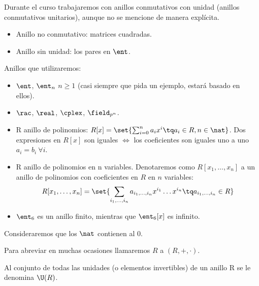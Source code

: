 \nota Durante el curso trabajaremos con anillos conmutativos con unidad (anillos conmutativos unitarios), aunque no se mencione de manera explícita.

\begin{example}
\begin{itemize}
	\item Anillo no conmutativo: matrices cuadradas.
	\item Anillo sin unidad: los pares en $\ent$.
\end{itemize}
\end{example}


\begin{example}
Anillos que utilizaremos:
\begin{itemize}
	\item $\ent$, $\ent_n$ $n \geq 1$ (casi siempre que pida un ejemplo, estará basado en ellos).
	\item $\rac$, $\real$, $\cplex$, $\field_{p^n}$.
	\item R anillo de polinomios: $R[x] = \set{ \sum_{i=0}^n a_i x^i \tq a_i \in R, n \in \nat}$. Dos expresiones en $R[x]$ son iguales $\iff$ los coeficientes son iguales uno a uno\ie $a_i = b_i \ \forall i$.
	\item R anillo de polinomios en n variables. Denotaremos como $R[x_1,\dots,x_n]$ a un anillo de polinomios con coeficientes en $R$ en $n$ variables:
	\[ R[x_1,\dots,x_n] = \set{ \sum_{i_1,\dots,i_n} a_{i_1,\dots,i_n} x^{i_1}\dots x^{i_n} \tq a_{i_1,\dots,i_n} \in R } \]
	\item $\ent_6$ es un anillo finito, mientras que $\ent_6[x]$ es infinito.
\end{itemize}
\end{example}


\nota Consideraremos que los $\nat$ contienen al 0.

\notacion Para abreviar en muchas ocasiones llamaremos $R$ a $(R,+,\cdot)$.


\begin{defn}[Unidades\IS de R: $\U(R)$]
Al conjunto de todas las unidades (o elementos invertibles) de un anillo R se le denomina $\U(R)$.
\end{defn}

